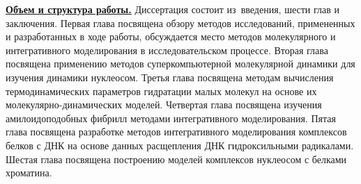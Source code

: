 \underline{\textbf{Объем и структура работы.}} Диссертация состоит из~введения, шести глав и заключения.
Первая глава посвящена обзору методов исследований, примененных и разработанных в ходе работы, обсуждается место методов молекулярного и интегративного моделирования в исследовательском процессе. Вторая глава посвящена применению методов суперкомпьютерной молекулярной динамики для изучения динамики нуклеосом. Третья глава посвящена методам вычисления термодинамических параметров гидратации малых молекул на основе их молекулярно-динамических моделей. Четвертая глава посвящена изучения амилоидоподобных фибрилл методами интегративного моделирования. Пятая глава посвящена разработке методов интегративного моделирования комплексов белков с ДНК на основе данных расщепления ДНК гидроксильными радикалами. Шестая глава посвящена построению моделей комплексов нуклеосом с белками хроматина.
